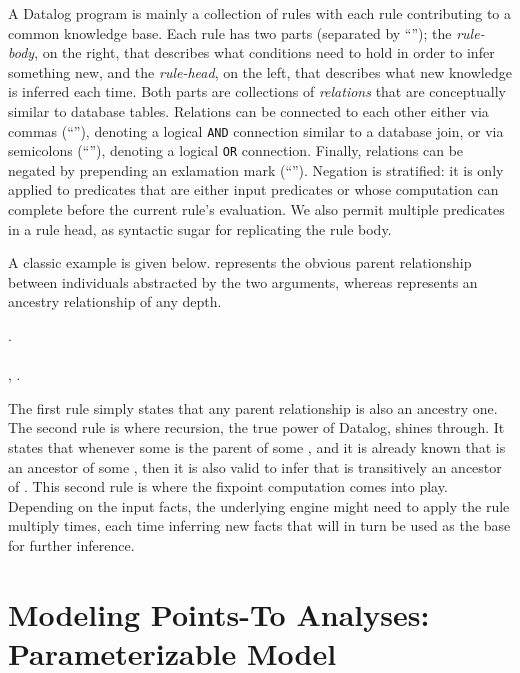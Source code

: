 A Datalog program is mainly a collection of rules with each rule contributing to a common knowledge base. Each rule has two parts (separated by ``\dlIf{}''); the \emph{rule-body}, on the right, that describes what conditions need to hold in order to infer something new, and the \emph{rule-head}, on the left, that describes what new knowledge is inferred each time. Both parts are collections of \emph{relations} that are conceptually similar to database tables. Relations can be connected to each other either via commas (``\code{,}''), denoting a logical \texttt{AND} connection similar to a database join, or via semicolons (``\code{;}''), denoting a logical \texttt{OR} connection. Finally, relations can be negated by prepending an exlamation mark (``\code{!}''). Negation is stratified: it is only applied to predicates that are either input predicates or whose computation can complete before the current rule's evaluation. We also permit multiple predicates in a rule head, as syntactic sugar for replicating the rule body.

A classic example is given below.  represents the obvious parent relationship between individuals abstracted by the two arguments, whereas  represents an ancestry relationship of any depth. 

\begin{datalog}
 \dlIf{} . \\
\\
 \dlIf{} , .
\end{datalog}

The first rule simply states that any parent relationship is also an ancestry one. The second rule is where recursion, the true power of Datalog, shines through. It states that whenever some  is the parent of some , and it is already known that  is an ancestor of some , then it is also valid to infer that  is transitively an ancestor of . This second rule is where the fixpoint computation comes into play. Depending on the input facts, the underlying engine might need to apply the rule multiply times, each time inferring new facts that will in turn be used as the base for further inference.


\section{Modeling Points-To Analyses: Parameterizable Model}
\label{sec:intro:model}

